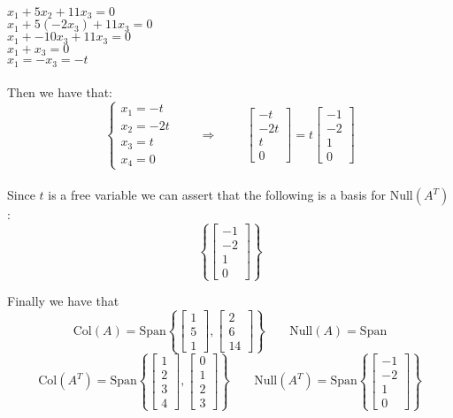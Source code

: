 \documentclass{article}
\begin{document}
$x_1+5x_2+11x_3=0$\\
$x_1+5(-2x_3)+11x_3=0$\\
$x_1+-10x_3+11x_3=0$\\
$x_1+x_3=0$\\
$x_1=-x_3=-t$\\\\
Then we have that: $$\begin{cases}
    x_1 = -t\\
    x_2 = -2t\\
    x_3 = t\\
    x_4 = 0
\end{cases}\;\;\;\;\;\;\;\Rightarrow\;\;\;\;\;\;\;\;\begin{bmatrix}
    -t\\-2t\\t\\0
\end{bmatrix}=t\begin{bmatrix}
    -1\\-2\\1\\0
\end{bmatrix}$$\\
Since $t$ is a free variable we can assert that the following is a basis for $\text{Null}(A^T)$:$$\left\{\begin{bmatrix}
    -1\\-2\\1\\0
\end{bmatrix}\right\}$$

Finally we have that$$\text{Col}(A)=\text{Span}\left\{\begin{bmatrix}
    1\\5\\1
\end{bmatrix},\begin{bmatrix}
    2\\6\\14
\end{bmatrix}\right\}\;\;\;\;\;\;\;
\text{Null}(A)=\text{Span} $$ $$\text{Col}(A^T)=\text{Span}\left\{\begin{bmatrix}
    1\\2\\3\\4
\end{bmatrix},\begin{bmatrix}
    0\\1\\2\\3
\end{bmatrix}\right\}\;\;\;\;\;\;\;
\text{Null}(A^T)=\text{Span}\left\{\begin{bmatrix}
    -1\\-2\\1\\0
\end{bmatrix}\right\}$$
\end{document}
